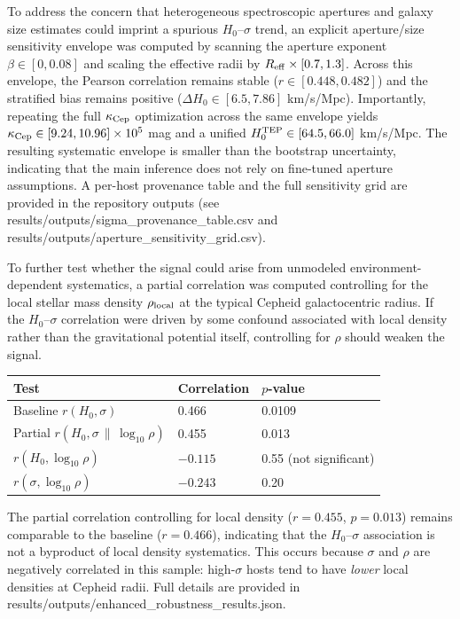 \documentclass[
]{article}
\newcounter{none} %
\begin{document}
To address the concern that heterogeneous spectroscopic apertures and
galaxy size estimates could imprint a spurious \(H_0\)--\(\sigma\)
trend, an explicit aperture/size sensitivity envelope was computed by
scanning the aperture exponent \(\beta \in [0, 0.08]\) and scaling the
effective radii by \(R_{\rm
eff}\times[0.7, 1.3]\). Across this envelope, the Pearson correlation
remains stable (\(r \in [0.448, 0.482]\)) and the stratified bias
remains positive (\(\Delta H_0 \in [6.5, 7.86]\) km/s/Mpc). Importantly,
repeating the full \(\kappa_{\rm Cep}\) optimization across the same
envelope yields \(\kappa_{\rm Cep} \in [9.24, 10.96]\times10^5\) mag and
a unified \(H_0^{\rm TEP} \in [64.5, 66.0]\) km/s/Mpc. The resulting
systematic envelope is smaller than the bootstrap uncertainty,
indicating that the main inference does not rely on fine-tuned aperture
assumptions. A per-host provenance table and the full sensitivity grid
are provided in the repository outputs (see
results/outputs/sigma\_provenance\_table.csv and
results/outputs/aperture\_sensitivity\_grid.csv).

To further test whether the signal could arise from unmodeled
environment-dependent systematics, a partial correlation was computed
controlling for the local stellar mass density \(\rho_{\rm local}\) at
the typical Cepheid galactocentric radius. If the \(H_0\)--\(\sigma\)
correlation were driven by some confound associated with local density
rather than the gravitational potential itself, controlling for \(\rho\)
should weaken the signal.

{\def\LTcaptype{none} %
\begin{longtable}[]{@{}lll@{}}
\toprule\noalign{}
Test & Correlation & \(p\)-value \\
\midrule\noalign{}
\endhead
\bottomrule\noalign{}
\endlastfoot
Baseline \(r(H_0, \sigma)\) & 0.466 & 0.0109 \\
Partial \(r(H_0, \sigma \,\|\, \log_{10}\rho)\) & 0.455 & 0.013 \\
\(r(H_0, \log_{10}\rho)\) & \(-0.115\) & 0.55 (not significant) \\
\(r(\sigma, \log_{10}\rho)\) & \(-0.243\) & 0.20 \\
\end{longtable}
}

The partial correlation controlling for local density (\(r = 0.455\),
\(p = 0.013\)) remains comparable to the baseline (\(r = 0.466\)),
indicating that the \(H_0\)--\(\sigma\) association is not a byproduct
of local density systematics. This occurs because \(\sigma\) and
\(\rho\) are negatively correlated in this sample: high-\(\sigma\) hosts
tend to have \emph{lower} local densities at Cepheid radii. Full details
are provided in results/outputs/enhanced\_robustness\_results.json.
\end{document}
